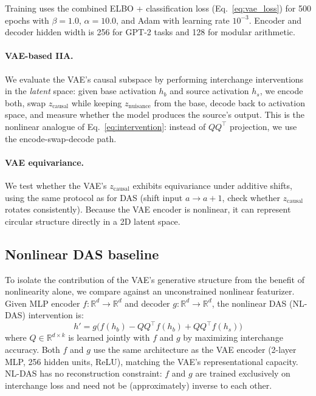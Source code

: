 \documentclass{article}
\newcommand{\R}{\mathbb{R}}
\begin{document}
Training uses the combined ELBO + classification loss (Eq.~\ref{eq:vae_loss})
for 500 epochs with $\beta = 1.0$, $\alpha = 10.0$, and Adam with learning
rate $10^{-3}$.
Encoder and decoder hidden width is 256 for GPT-2 tasks and 128 for modular
arithmetic.

\paragraph{VAE-based IIA.}
We evaluate the VAE's causal subspace by performing interchange interventions in
the \emph{latent} space: given base activation $h_b$ and source activation
$h_s$, we encode both, swap $z_\text{causal}$ while keeping $z_\text{nuisance}$
from the base, decode back to activation space, and measure whether the model
produces the source's output. This is the nonlinear analogue of
Eq.~\ref{eq:intervention}: instead of $QQ^\top$ projection, we use the
encode-swap-decode path.

\paragraph{VAE equivariance.}
We test whether the VAE's $z_\text{causal}$ exhibits equivariance under additive
shifts, using the same protocol as for DAS (shift input $a \to a+1$, check
whether $z_\text{causal}$ rotates consistently). Because the VAE encoder is
nonlinear, it can represent circular structure directly in a 2D latent space.

\subsection{Nonlinear DAS baseline}
\label{sec:nldas}

To isolate the contribution of the VAE's generative structure from the benefit
of nonlinearity alone, we compare against an unconstrained nonlinear featurizer.
Given MLP encoder $f: \R^d \to \R^d$ and decoder $g: \R^d \to \R^d$, the
nonlinear DAS (NL-DAS) intervention is:
\begin{equation}
h' = g\bigl(f(h_b) - QQ^\top f(h_b) + QQ^\top f(h_s)\bigr)
\label{eq:nldas}
\end{equation}
where $Q \in \R^{d \times k}$ is learned jointly with $f$ and $g$ by maximizing
interchange accuracy. Both $f$ and $g$ use the same architecture as the VAE
encoder (2-layer MLP, 256 hidden units, ReLU), matching the VAE's representational
capacity. NL-DAS has no reconstruction constraint: $f$ and $g$
are trained exclusively on interchange loss and need not be (approximately)
inverse to each other.
\end{document}
